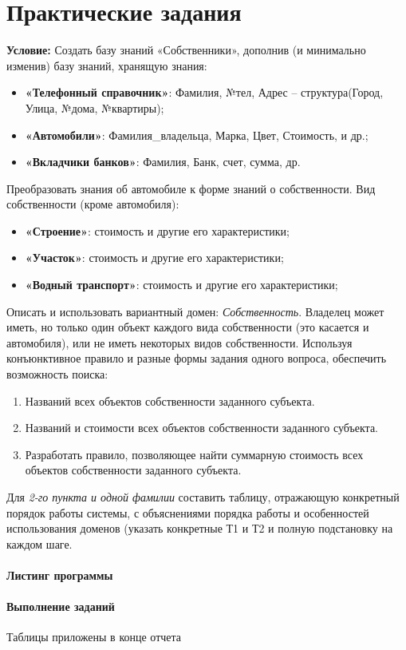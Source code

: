 \chapter{Практические задания}

\textbf{Условие:} Создать базу знаний «Собственники», дополнив (и  минимально  изменив) базу знаний, хранящую знания:

\begin{itemize}
	\item \textbf{«Телефонный  справочник»}: Фамилия,  №тел, Адрес -- структура(Город, Улица, №дома, №квартиры);
	\item \textbf{«Автомобили»}: Фамилия\_владельца, Марка, Цвет, Стоимость, и др.;
	\item \textbf{«Вкладчики банков»}: Фамилия, Банк, счет, сумма, др.
\end{itemize}

Преобразовать знания об автомобиле к форме знаний о собственности. Вид собственности (кроме автомобиля):

\begin{itemize}
	\item \textbf{«Строение»}: стоимость и другие его характеристики;
	\item \textbf{«Участок»}: стоимость и другие его характеристики;
	\item \textbf{«Водный транспорт»}: стоимость и другие его характеристики;
\end{itemize}

Описать и использовать вариантный домен: \textit{Собственность}. Владелец может иметь, но только один объект каждого вида собственности (это касается и автомобиля), или не иметь некоторых видов собственности. Используя конъюнктивное правило и разные формы задания одного вопроса, обеспечить возможность поиска:

\begin{enumerate}
	\item Названий всех объектов собственности заданного субъекта.
	\item Названий и стоимости всех объектов собственности заданного субъекта.
	\item Разработать  правило, позволяющее найти суммарную стоимость всех объектов собственности заданного субъекта.
\end{enumerate}

Для  \textit{2-го пункта и одной фамилии} составить  таблицу,  отражающую конкретный порядок работы системы, с объяснениями порядка работы и особенностей использования доменов (указать конкретные Т1 и Т2 и полную подстановку на каждом шаге.


\subsubsection{Листинг программы}




\subsubsection{Выполнение заданий}

Таблицы приложены в конце отчета
